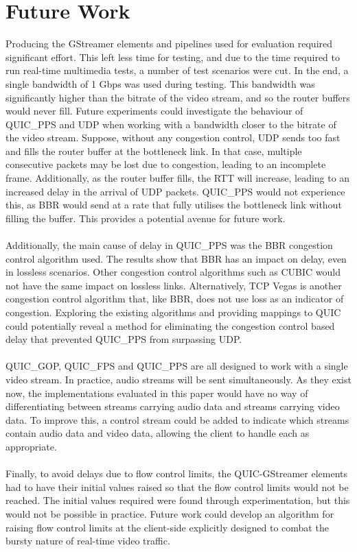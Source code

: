 \documentclass{mpaper}
\begin{document}
\section{Future Work} \label{Future Work}

\noindent Producing the GStreamer elements and pipelines used for evaluation required significant effort. This left less time for testing, and due to the time required to run real-time multimedia tests, a number of test scenarios were cut. In the end, a single bandwidth of 1 Gbps was used during testing. This bandwidth was significantly higher than the bitrate of the video stream, and so the router buffers would never fill. Future experiments could investigate the behaviour of QUIC\_PPS and UDP when working with a bandwidth closer to the bitrate of the video stream. Suppose, without any congestion control, UDP sends too fast and fills the router buffer at the bottleneck link. In that case, multiple consecutive packets may be lost due to congestion, leading to an incomplete frame. Additionally, as the router buffer fills, the RTT will increase, leading to an increased delay in the arrival of UDP packets. QUIC\_PPS would not experience this, as BBR would send at a rate that fully utilises the bottleneck link without filling the buffer. This provides a potential avenue for future work.
\\\\
Additionally, the main cause of delay in QUIC\_PPS was the BBR congestion control algorithm used. The results show that BBR has an impact on delay, even in lossless scenarios. Other congestion control algorithms such as CUBIC would not have the same impact on lossless links. Alternatively, TCP Vegas is another congestion control algorithm that, like BBR, does not use loss as an indicator of congestion. Exploring the existing algorithms and providing mappings to QUIC could potentially reveal a method for eliminating the congestion control based delay that prevented QUIC\_PPS from surpassing UDP.
\\\\
QUIC\_GOP, QUIC\_FPS and QUIC\_PPS are all designed to work with a single video stream. In practice, audio streams will be sent simultaneously. As they exist now, the implementations evaluated in this paper would have no way of differentiating between streams carrying audio data and streams carrying video data. To improve this, a control stream could be added to indicate which streams contain audio data and video data, allowing the client to handle each as appropriate.
\\\\
Finally, to avoid delays due to flow control limits, the QUIC-GStreamer elements had to have their initial values raised so that the flow control limits would not be reached. The initial values required were found through experimentation, but this would not be possible in practice. Future work could develop an algorithm for raising flow control limits at the client-side explicitly designed to combat the bursty nature of real-time video traffic.
\end{document}
